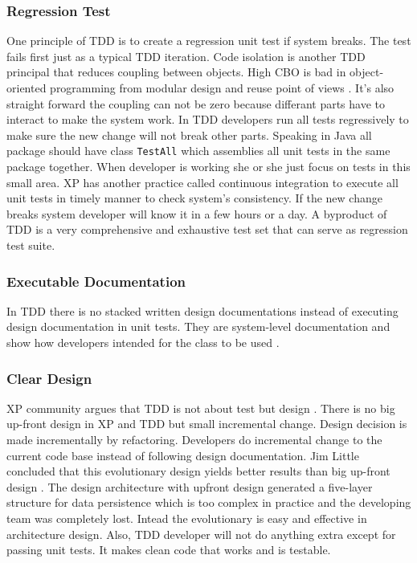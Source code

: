 \subsubsection{Regression Test}
One principle of TDD is to create a regression unit test if system breaks.
The test fails first just as a typical TDD iteration. Code isolation is
another TDD principal that reduces coupling between objects. High CBO is
bad in object-oriented programming from modular design and reuse point of
views \cite{CKMetrics}. It's also straight forward the coupling can not be
zero because differant parts have to interact to make the system work. In
TDD developers run all tests regressively to make sure the new change will
not break other parts. Speaking in Java all package should have class
\verb!TestAll!  which assemblies all unit tests in the same package
together. When developer is working she or she just focus on tests in this
small area. XP has another practice called continuous integration to
execute all unit tests in timely manner to check system's consistency. If
the new change breaks system developer will know it in a few hours or a
day. A byproduct of TDD is a very comprehensive and exhaustive test set
that can serve as regression test suite.
 
\subsubsection{Executable Documentation}
In TDD there is no stacked written design documentations instead of
executing design documentation in unit tests. They are system-level
documentation and show how developers intended for the class to be used
\cite{ObjectMentorTDD,Ambler:03}.

\subsubsection{Clear Design}
XP community argues that TDD is not about test but design \cite{North:01}.
There is no big up-front design in XP and TDD but small incremental change.
Design decision is made incrementally by refactoring. Developers do
incremental change to the current code base instead of following design
documentation. Jim Little concluded that this evolutionary design yields
better results than big up-front design \cite{Little:01}. The design
architecture with upfront design generated a five-layer structure for data
persistence which is too complex in practice and the developing team was
completely lost. Intead the evolutionary is easy and effective in
architecture design. Also, TDD developer will not do anything extra except
for passing unit tests. It makes clean code that works \cite{Beck:03} and
is testable.

